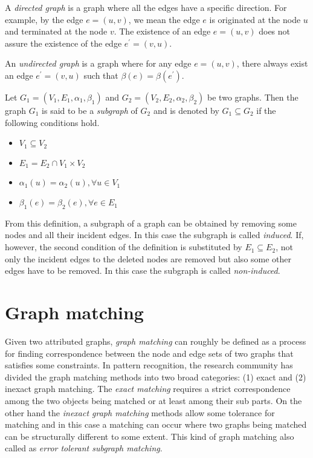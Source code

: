 \begin{definition}
A \emph{directed graph} is a graph where all the edges have a specific direction. For example, by the edge $e=(u,v)$, we mean the edge $e$ is originated at the node $u$ and terminated at the node $v$. The existence of an edge $e=(u,v)$ does not assure the existence of the edge $e^\prime=(v,u)$.
\end{definition}

\begin{definition}
An \emph{undirected graph} is a graph where for any edge $e=(u,v)$, there always exist an edge $e^\prime=(v,u)$ such that $\beta(e)=\beta(e^\prime)$.
\end{definition}

\begin{definition}[Subgraph]
Let $G_1=(V_1,E_1,\alpha_1,\beta_1)$ and $G_2=(V_2,E_2,\alpha_2,\beta_2)$ be two graphs. Then the graph $G_1$ is said to be a \emph{subgraph} of $G_2$ and is denoted by $G_1\subseteq G_2$ if the following conditions hold.
\end{definition}

\begin{itemize}
\item $V_1\subseteq V_2$
\item $E_1=E_2\cap V_1\times V_2$
\item $\alpha_1(u)=\alpha_2(u),\forall u\in V_1$
\item $\beta_1(e)=\beta_2(e),\forall e\in E_1$
\end{itemize}

From this definition, a subgraph of a graph can be obtained by removing some nodes and all their incident edges. In this case the subgraph is called \emph{induced}. If, however, the second condition of the definition is substituted by $E_1\subseteq E_2$, not only the incident edges to the deleted nodes are removed but also some other edges have to be removed. In this case the subgraph is called \emph{non-induced}.

\section{Graph matching}
Given two attributed graphs, \emph{graph matching} can roughly be defined as a process for finding correspondence between the node and edge sets of two graphs that satisfies some constraints. In pattern recognition, the research community has divided the graph matching methods into two broad categories: (1) exact and (2) inexact graph matching. The \emph{exact matching} requires a strict correspondence among the two objects being matched or at least among their sub parts. On the other hand the \emph{inexact graph matching} methods allow some tolerance for matching and in this case a matching can occur where two graphs being matched can be structurally different to some extent. This kind of graph matching also called as \emph{error tolerant subgraph matching}.


